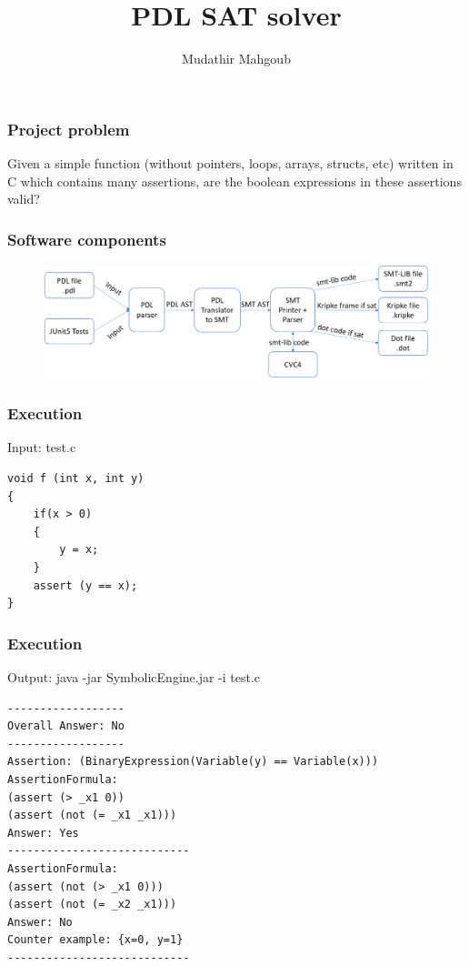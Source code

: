 \documentclass{beamer}
\title{PDL SAT solver}
\author{Mudathir Mahgoub}
\begin{document}
 
\frame{\titlepage}
 
\begin{frame}
\frametitle{Project problem}
Given a simple function (without pointers, loops, arrays, structs, etc) written in C which contains many assertions, are the boolean expressions in these assertions valid?
\end{frame}

\begin{frame}
\frametitle{Software components}
\begin{figure}
 \centering
 \includegraphics[scale=.21,keepaspectratio=true]{./solver.png}
\end{figure}
\end{frame}


\begin{frame}[fragile]
\frametitle{Execution}
\scriptsize

\begin{block}{Input: test.c}
\begin{lstlisting}  
void f (int x, int y)
{
    if(x > 0)
    {
        y = x;
    }
    assert (y == x);
}
\end{lstlisting}
\end{block}
\end{frame}


\begin{frame}[fragile]
\frametitle{Execution}
\begin{block} {Output: java -jar SymbolicEngine.jar -i test.c}
\small
\begin{lstlisting} 
------------------
Overall Answer: No
------------------
Assertion: (BinaryExpression(Variable(y) == Variable(x)))
AssertionFormula:
(assert (> _x1 0))
(assert (not (= _x1 _x1)))
Answer: Yes
----------------------------
AssertionFormula:
(assert (not (> _x1 0)))
(assert (not (= _x2 _x1)))
Answer: No
Counter example: {x=0, y=1}
----------------------------
\end{lstlisting} 
\end{block}
\end{frame}
\end{document}
